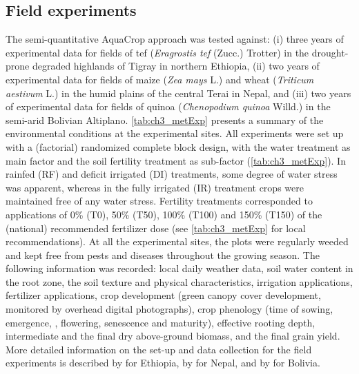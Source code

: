 \subsection{Field experiments}
The semi-quantitative AquaCrop approach was tested against: (i) three years of experimental data for fields of tef (\textit{Eragrostis tef} (Zucc.) Trotter) in the drought-prone degraded highlands of Tigray in northern Ethiopia, (ii) two years of experimental data for fields of maize (\textit{Zea mays} L.) and wheat (\textit{Triticum aestivum} L.) in the humid plains of the central Terai in Nepal, and (iii) two years of experimental data for fields of quinoa (\textit{Chenopodium quinoa} Willd.)  in the semi-arid Bolivian Altiplano. \autoref{tab:ch3_metExp} presents a summary of the environmental conditions at the experimental sites. All experiments were set up with a (factorial) randomized complete block design, with the water treatment as main factor and the soil fertility treatment as sub-factor (\autoref{tab:ch3_metExp}). In rainfed (RF) and deficit irrigated (DI) treatments, some degree of water stress was apparent, whereas in the fully irrigated (IR) treatment crops were maintained free of any water stress. Fertility treatments corresponded to applications of 0\% (T0), 50\% (T50), 100\% (T100) and 150\% (T150) of the (national) recommended fertilizer dose (see \autoref{tab:ch3_metExp} for local recommendations). At all the experimental sites, the plots were regularly weeded and kept free from pests and diseases throughout the growing season. The following information was recorded: local daily weather data, soil water content in the root zone, the soil texture and physical characteristics, irrigation applications, fertilizer applications, crop development (green canopy cover development, monitored by overhead digital photographs), crop phenology (time of sowing, emergence, \CCx, flowering, senescence and maturity), effective rooting depth, intermediate and the final dry above-ground biomass, and the final grain yield. More detailed information on the set-up and data collection for the field experiments is described by \textcite{tsegay2012} for Ethiopia, by \textcite{shrestha2013a} for Nepal, and by \textcite{geerts2008a} for Bolivia.

